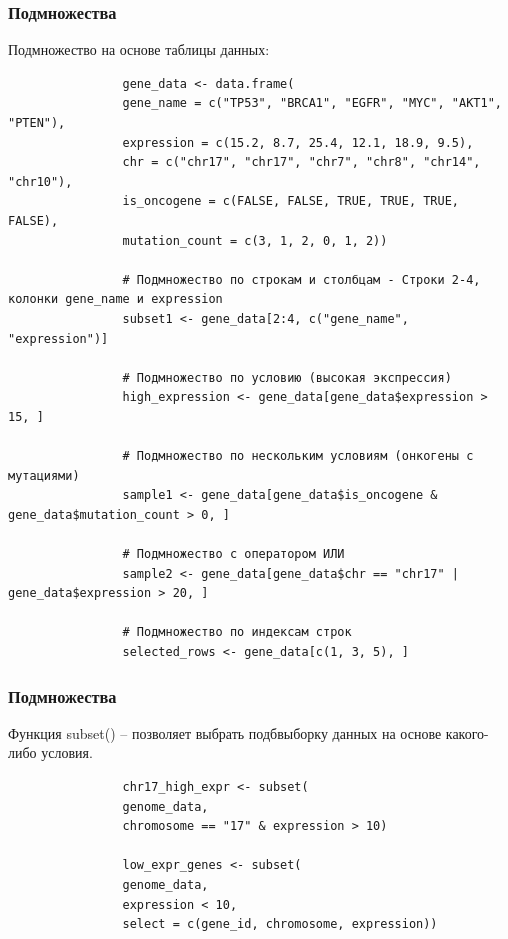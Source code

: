 \documentclass[11pt,a4paper]{beamer}
\begin{document}
	\begin{frame}[fragile]
		\frametitle{Подмножества}
		Подмножество на основе таблицы данных:
		{\fontsize{7}{8}\selectfont
			\begin{verbatim}
				gene_data <- data.frame(
				gene_name = c("TP53", "BRCA1", "EGFR", "MYC", "AKT1", "PTEN"),
				expression = c(15.2, 8.7, 25.4, 12.1, 18.9, 9.5),
				chr = c("chr17", "chr17", "chr7", "chr8", "chr14", "chr10"),
				is_oncogene = c(FALSE, FALSE, TRUE, TRUE, TRUE, FALSE),
				mutation_count = c(3, 1, 2, 0, 1, 2))
				
				# Подмножество по строкам и столбцам - Строки 2-4, колонки gene_name и expression
				subset1 <- gene_data[2:4, c("gene_name", "expression")]
				
				# Подмножество по условию (высокая экспрессия)
				high_expression <- gene_data[gene_data$expression > 15, ]
				
				# Подмножество по нескольким условиям (онкогены с мутациями)
				sample1 <- gene_data[gene_data$is_oncogene & gene_data$mutation_count > 0, ]
				
				# Подмножество с оператором ИЛИ
				sample2 <- gene_data[gene_data$chr == "chr17" | gene_data$expression > 20, ]
				
				# Подмножество по индексам строк
				selected_rows <- gene_data[c(1, 3, 5), ]   \end{verbatim}
		}
		
		
	\end{frame}
	
	\begin{frame}[fragile]
		\frametitle{Подмножества}
		Функция subset() – позволяет выбрать подбвыборку данных на основе какого-либо условия.
		{\fontsize{8}{9}\selectfont
			
			\begin{verbatim}
				chr17_high_expr <- subset(
				genome_data, 
				chromosome == "17" & expression > 10)
				
				low_expr_genes <- subset(
				genome_data, 
				expression < 10, 
				select = c(gene_id, chromosome, expression))\end{verbatim}		
		}
		
	\end{frame}
	
\end{document}
